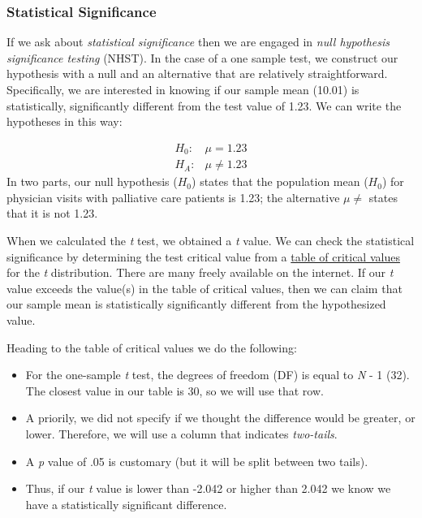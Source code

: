 \documentclass[
  11pt,
]{book}
\providecommand{\tightlist}{%
  \setlength{\itemsep}{0pt}\setlength{\parskip}{0pt}}
\begin{document}
\hypertarget{statistical-significance}{%
\subsubsection{Statistical Significance}\label{statistical-significance}}

If we ask about \emph{statistical significance} then we are engaged in \emph{null hypothesis significance testing} (NHST). In the case of a one sample test, we construct our hypothesis with a null and an alternative that are relatively straightforward. Specifically, we are interested in knowing if our sample mean (10.01) is statistically, significantly different from the test value of 1.23. We can write the hypotheses in this way:

\[
\begin{array}{ll}
H_0: & \mu = 1.23 \\
H_A: & \mu \neq 1.23
\end{array}
\]
In two parts, our null hypothesis (\(H_0\)) states that the population mean (\(H_0\)) for physician visits with palliative care patients is 1.23; the alternative \(\mu \neq\) states that it is not 1.23.

When we calculated the \emph{t} test, we obtained a \emph{t} value. We can check the statistical significance by determining the test critical value from a \href{https://www.statology.org/t-distribution-table/}{table of critical values} for the \emph{t} distribution. There are many freely available on the internet. If our \emph{t} value exceeds the value(s) in the table of critical values, then we can claim that our sample mean is statistically significantly different from the hypothesized value.

Heading to the table of critical values we do the following:

\begin{itemize}
\tightlist
\item
  For the one-sample \emph{t} test, the degrees of freedom (DF) is equal to \emph{N} - 1 (32). The closest value in our table is 30, so we will use that row.
\item
  A priorily, we did not specify if we thought the difference would be greater, or lower. Therefore, we will use a column that indicates \emph{two-tails}.
\item
  A \emph{p} value of .05 is customary (but it will be split between two tails).
\item
  Thus, if our \emph{t} value is lower than -2.042 or higher than 2.042 we know we have a statistically significant difference.
\end{itemize}
\end{document}
